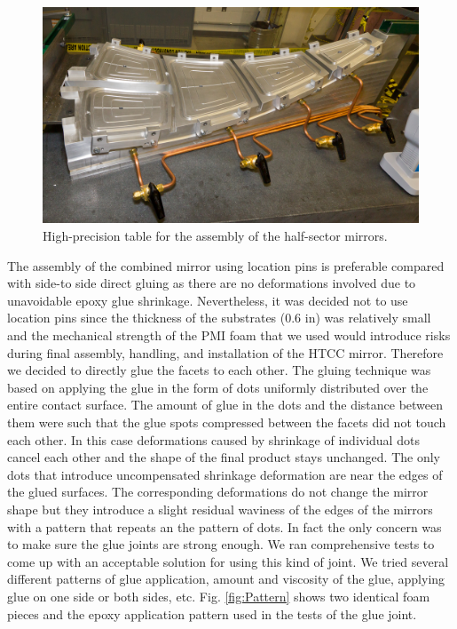 \begin{figure}[ht]
    \centering
    \includegraphics[width=1.0\linewidth]{images/Half-sector_assem_tb2.JPG}
    \caption{High-precision table for the assembly of the half-sector mirrors.}
    \label{fig:Half-sector_assem_tb2}
\end{figure}

\indent The assembly of the combined mirror using location pins is preferable compared with side-to side direct gluing as there are no deformations involved due to unavoidable epoxy glue shrinkage. Nevertheless, it was decided not to use location pins since the thickness of the substrates (0.6 in) was relatively small and the mechanical strength of the PMI foam that we used would introduce risks during final assembly, handling, and installation of the HTCC mirror. Therefore we decided to directly glue the facets to each other. The gluing technique was based on applying the glue in the form of dots uniformly distributed over the entire contact surface. The amount of glue in the dots and the distance between them were such that the glue spots compressed between the facets did not touch each other. In this case deformations caused by shrinkage of individual dots cancel each other and the shape of the final product stays unchanged. The only dots that introduce uncompensated shrinkage deformation are near the edges of the glued surfaces. The corresponding deformations do not change the mirror shape but they introduce a slight residual waviness of the edges of the mirrors with a pattern that repeats an the pattern of dots. In fact the only concern was to make sure the glue joints are strong enough. We ran comprehensive tests to come up with an acceptable solution for using this kind of joint. We  tried several different patterns of glue application, amount and viscosity of the glue, applying glue on one side or both sides, etc. Fig. \ref{fig:Pattern} shows two identical foam pieces and the epoxy application pattern used in the tests of the glue joint. 

